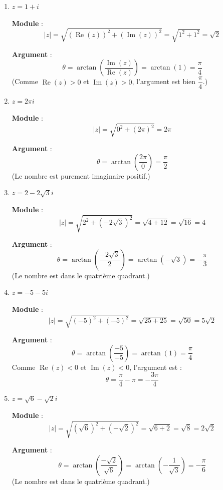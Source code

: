 \documentclass[a4paper,12pt]{article}
\begin{document}
\begin{solutionbox}
\begin{enumerate}
    \item \( z = 1 + i \)

    \textbf{Module} :
    \[
    |z| = \sqrt{(\operatorname{Re}(z))^2 + (\operatorname{Im}(z))^2} = \sqrt{1^2 + 1^2} = \sqrt{2}
    \]

    \textbf{Argument} :
    \[
    \theta = \arctan\left(\dfrac{\operatorname{Im}(z)}{\operatorname{Re}(z)}\right) = \arctan(1) = \dfrac{\pi}{4}
    \]
    (Comme \( \operatorname{Re}(z) > 0 \) et \( \operatorname{Im}(z) > 0 \), l'argument est bien \( \dfrac{\pi}{4} \).)

    \item \( z = 2\pi i \)

    \textbf{Module} :
    \[
    |z| = \sqrt{0^2 + (2\pi)^2} = 2\pi
    \]

    \textbf{Argument} :
    \[
    \theta = \arctan\left(\dfrac{2\pi}{0}\right) = \dfrac{\pi}{2}
    \]
    (Le nombre est purement imaginaire positif.)

    \item \( z = 2 - 2\sqrt{3}i \)

    \textbf{Module} :
    \[
    |z| = \sqrt{2^2 + (-2\sqrt{3})^2} = \sqrt{4 + 12} = \sqrt{16} = 4
    \]

    \textbf{Argument} :
    \[
    \theta = \arctan\left(\dfrac{-2\sqrt{3}}{2}\right) = \arctan(-\sqrt{3}) = -\dfrac{\pi}{3}
    \]
    (Le nombre est dans le quatrième quadrant.)

    \item \( z = -5 - 5i \)

    \textbf{Module} :
    \[
    |z| = \sqrt{(-5)^2 + (-5)^2} = \sqrt{25 + 25} = \sqrt{50} = 5\sqrt{2}
    \]

    \textbf{Argument} :
    \[
    \theta = \arctan\left(\dfrac{-5}{-5}\right) = \arctan(1) = \dfrac{\pi}{4}
    \]
    Comme \( \operatorname{Re}(z) < 0 \) et \( \operatorname{Im}(z) < 0 \), l'argument est :
    \[
    \theta = \dfrac{\pi}{4} - \pi = -\dfrac{3\pi}{4}
    \]

    \item \( z = \sqrt{6} - \sqrt{2}i \)

    \textbf{Module} :
    \[
    |z| = \sqrt{(\sqrt{6})^2 + (-\sqrt{2})^2} = \sqrt{6 + 2} = \sqrt{8} = 2\sqrt{2}
    \]

    \textbf{Argument} :
    \[
    \theta = \arctan\left(\dfrac{-\sqrt{2}}{\sqrt{6}}\right) = \arctan\left(-\dfrac{1}{\sqrt{3}}\right) = -\dfrac{\pi}{6}
    \]
    (Le nombre est dans le quatrième quadrant.)
\end{enumerate}
\end{solutionbox}
\end{document}
